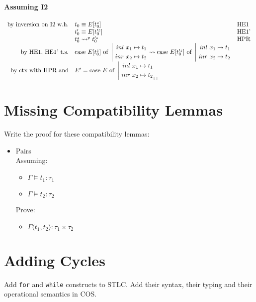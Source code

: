 \documentclass{article}
\newcommand{\inl}[0]{\ensuremath{\ inl\ }}
\newcommand{\inr}[0]{\ensuremath{\ inr\ }}
\newcommand{\case}[3]{\ensuremath{\text{case}\ #1\ \text{of}\ \left|\begin{aligned}#2\\#3\end{aligned}\right.}}
\begin{document}
\paragraph{Assuming I2}
\[
    \begin{array}{rl @{\quad} l}
        \text{by inversion on I2 w.h.}   &  t_0  \equiv E[t_0^z]         & \text{HE1}\\
                                         &  t_0' \equiv E[t_0'^z]        & \text{HE1'}\\
                                         &  t_0^z \leadsto^p t_0'^z     & \text{HPR}\\
        \text{by HE1, HE1' t.s.}         &  \case{E[t_0^z]}{\inl x_1 \mapsto t_1}{\inr x_2 \mapsto t_2} \leadsto \case{E[t_0'^z]}{\inl x_1 \mapsto t_1}{\inr x_2 \mapsto t_2} \\
        \text{by ctx with HPR and}       &  E' = \case{E}{\inl x_1 \mapsto t_1}{\inr x_2 \mapsto t_2} _\square \\
    \end{array}
\]


\section{Missing Compatibility Lemmas}
Write the proof for these compatibility lemmas:
\begin{itemize}
    \item Pairs \\
        Assuming: \begin{itemize}
            \item $\Gamma \vDash t_1:\tau_1$
            \item $\Gamma \vDash t_2:\tau_2$
        \end{itemize}
        Prove: \begin{itemize}
            \item $\Gamma \langle t_1,t_2 \rangle : \tau_1\times\tau_2$
        \end{itemize}
\end{itemize}

\section{Adding Cycles}
Add \texttt{for} and \texttt{while} constructs to STLC. Add their syntax, their typing and their operational
semantics in COS.
\end{document}
